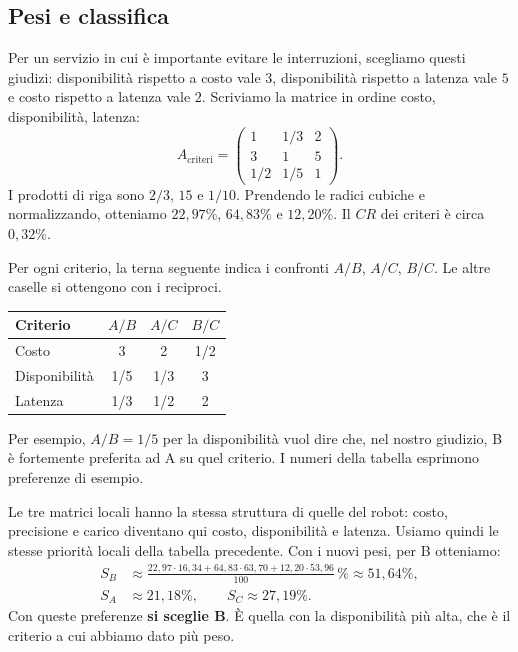 \subsection*{Pesi e classifica}

\noindent Per un servizio in cui è importante evitare le interruzioni,
scegliamo questi giudizi: disponibilità rispetto a costo vale $3$,
disponibilità rispetto a latenza vale $5$ e costo rispetto a latenza
vale $2$. Scriviamo la matrice in ordine costo, disponibilità, latenza:
\[
    A_{\text{criteri}}=\begin{pmatrix}
        1 & 1/3 & 2\\
        3 & 1 & 5\\
        1/2 & 1/5 & 1
    \end{pmatrix}.
\]
\noindent I prodotti di riga sono $2/3$, $15$ e $1/10$.
Prendendo le radici cubiche e normalizzando, otteniamo $22{,}97\%$,
$64{,}83\%$ e $12{,}20\%$. Il $CR$ dei criteri è circa $0{,}32\%$.

\noindent Per ogni criterio, la terna seguente indica i confronti
$A/B$, $A/C$, $B/C$. Le altre caselle si ottengono con i reciproci.
\begin{center}
    \begin{tabular}{lccc}
        \hline
        Criterio & $A/B$ & $A/C$ & $B/C$ \\
        \hline
        Costo & 3 & 2 & 1/2 \\
        Disponibilità & 1/5 & 1/3 & 3 \\
        Latenza & 1/3 & 1/2 & 2 \\
        \hline
    \end{tabular}
\end{center}

\noindent Per esempio, $A/B=1/5$ per la disponibilità vuol dire
che, nel nostro giudizio, B è fortemente preferita ad A su quel
criterio. I numeri della tabella esprimono preferenze di esempio.

\noindent Le tre matrici locali hanno la stessa struttura di quelle
del robot: costo, precisione e carico diventano qui costo,
disponibilità e latenza. Usiamo quindi le stesse priorità locali
della tabella precedente. Con i nuovi pesi, per B otteniamo:
\begin{align*}
    S_B &\approx \frac{22{,}97\cdot16{,}34
                    +64{,}83\cdot63{,}70
                    +12{,}20\cdot53{,}96}{100}\,\%
          \approx 51{,}64\%, \\
    S_A &\approx 21{,}18\%, \qquad S_C\approx 27{,}19\%.
\end{align*}
\noindent Con queste preferenze \textbf{si sceglie B}.
È quella con la disponibilità più alta, che è il criterio
a cui abbiamo dato più peso.
